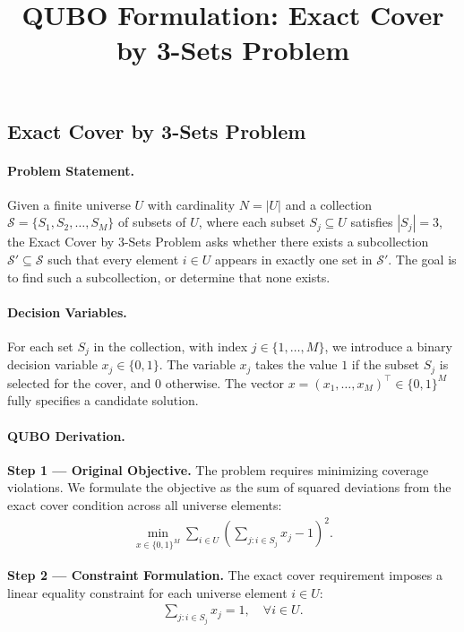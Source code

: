 \documentclass[12pt]{article}
\title{QUBO Formulation: Exact Cover by 3-Sets Problem}
\date{}
\begin{document}
\maketitle

\subsection*{Exact Cover by 3-Sets Problem}

\paragraph{Problem Statement.}
Given a finite universe $U$ with cardinality $N = |U|$ and a collection $\mathcal{S} = \{S_1, S_2, \dots, S_M\}$ of subsets of $U$, where each subset $S_j \subseteq U$ satisfies $|S_j| = 3$, the Exact Cover by 3-Sets Problem asks whether there exists a subcollection $\mathcal{S}' \subseteq \mathcal{S}$ such that every element $i \in U$ appears in exactly one set in $\mathcal{S}'$. The goal is to find such a subcollection, or determine that none exists.

\paragraph{Decision Variables.}
For each set $S_j$ in the collection, with index $j \in \{1, \dots, M\}$, we introduce a binary decision variable $x_j \in \{0, 1\}$. The variable $x_j$ takes the value $1$ if the subset $S_j$ is selected for the cover, and $0$ otherwise. The vector $x = (x_1, \dots, x_M)^\top \in \{0, 1\}^M$ fully specifies a candidate solution.

\paragraph{QUBO Derivation.}
\textbf{Step 1 --- Original Objective.} The problem requires minimizing coverage violations. We formulate the objective as the sum of squared deviations from the exact cover condition across all universe elements:
\begin{align}
    \min_{x \in \{0,1\}^M} \sum_{i \in U} \left( \sum_{j: i \in S_j} x_j - 1 \right)^2.
\end{align}

\textbf{Step 2 --- Constraint Formulation.} The exact cover requirement imposes a linear equality constraint for each universe element $i \in U$:
\begin{align}
    \sum_{j: i \in S_j} x_j = 1, \quad \forall i \in U.
\end{align}
\end{document}
